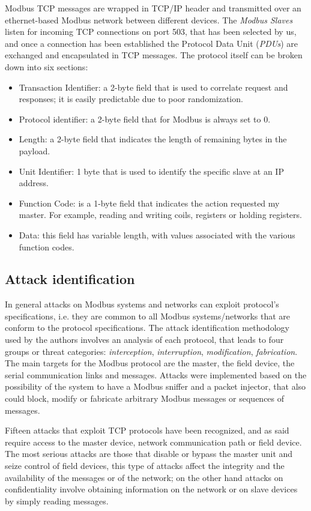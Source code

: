 \documentclass[12pt]{article}
\begin{document}
Modbus TCP messages are wrapped in TCP/IP header and transmitted over an ethernet-based Modbus network between different devices. The \textit{Modbus Slaves} listen for incoming TCP connections on port 503, that has been selected by us, and once a connection has been established the Protocol Data Unit (\textit{PDUs}) are exchanged and encapsulated in TCP messages. The protocol itself can be broken down into six sections: 
\begin{itemize}
    \item Transaction Identifier: a 2-byte field that is used to correlate request and responses; it is easily predictable due to poor randomization.
    \item Protocol identifier: a 2-byte field that for Modbus is always set to 0.
    \item Length: a 2-byte field that indicates the length of remaining bytes in the payload.
    \item Unit Identifier: 1 byte that is used to identify the specific slave at an IP address.
    \item Function Code: is a 1-byte field that indicates the action requested my master. For example, reading and writing coils, registers or holding registers.
    \item Data: this field has variable length, with values associated with the various function codes. 
\end{itemize}

\subsection{Attack identification}
In general attacks on Modbus systems and networks can exploit protocol's specifications, i.e. they are common to all Modbus systems/networks that are conform to the protocol specifications. The attack identification methodology used by the authors \cite{huitsing2008attack} involves an analysis of each protocol, that leads to four groups or threat categories: \textit{interception}, \textit{interruption}, \textit{modification}, \textit{fabrication}.
The main targets for the Modbus protocol are the master, the field device, the serial communication links and messages. Attacks were implemented based on the possibility of the system to have a Modbus sniffer and a packet injector, that also could block, modify or fabricate arbitrary Modbus messages or sequences of messages. 

Fifteen attacks that exploit TCP protocols have been recognized, and as said require access to the master device, network communication path or field device.
The most serious attacks are those that disable or bypass the master unit and seize control of field devices, this type of attacks affect the integrity and the availability of the messages or of the network; on the other hand attacks on confidentiality involve obtaining information on the network or on slave devices by simply reading messages.
\end{document}
